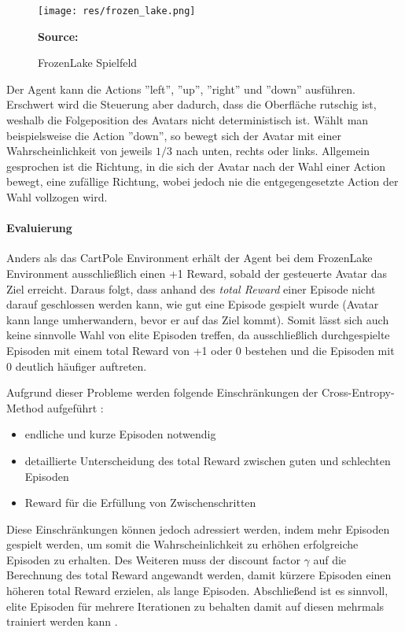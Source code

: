 \documentclass[11pt]{scrartcl}
\newcommand{\source}[1]{\vspace{-5pt} \caption*{\hfill \textbf{Source:} {#1}} }
\begin{document}
\begin{figure}[htp]
\centering
\texttt{[image: res/frozen\_lake.png]}
\caption{FrozenLake Spielfeld}
\source{\cite[~S.90 - Chapter 4 - Figure 5]{L2018}}
\label{fig:frozen_lake}
\end{figure}

\noindent
Der Agent kann die Actions ''left'', ''up'', ''right'' und ''down'' ausführen.
Erschwert wird die Steuerung aber dadurch, dass die Oberfläche rutschig ist, weshalb
die Folgeposition des Avatars nicht deterministisch ist. Wählt man beispielsweise die
Action ''down'', so bewegt sich der Avatar mit einer Wahrscheinlichkeit von jeweils
$1/3$ nach unten, rechts oder links. Allgemein gesprochen ist die Richtung, in die
sich der Avatar nach der Wahl einer Action bewegt, eine zufällige Richtung, wobei
jedoch nie die entgegengesetzte Action der Wahl vollzogen wird.


\paragraph*{Evaluierung}
\label{sec:cross_entropy_results}
\noindent
\newline
Anders als das CartPole Environment erhält der Agent bei dem FrozenLake Environment 
ausschließlich einen +1 Reward, sobald der gesteuerte Avatar das Ziel erreicht. Daraus folgt,
dass anhand des \textit{total Reward} einer Episode nicht darauf geschlossen werden kann,
wie gut eine Episode gespielt wurde (Avatar kann lange umherwandern, bevor er auf das Ziel kommt).
Somit lässt sich auch keine sinnvolle Wahl von elite Episoden treffen, da ausschließlich
durchgespielte Episoden mit einem total Reward von +1 oder 0 bestehen und die Episoden mit 0
deutlich häufiger auftreten.

Aufgrund dieser Probleme werden folgende Einschränkungen der Cross-Entropy-Method 
aufgeführt \cite[~S.92 f.]{L2018}:
\begin{itemize}
\itemsep0pt
\item endliche und kurze Episoden notwendig
\item detaillierte Unterscheidung des total Reward zwischen guten und schlechten Episoden
\item Reward für die Erfüllung von Zwischenschritten
  \label{itm:cross_entropy_limits}
\end{itemize}

Diese Einschränkungen können jedoch adressiert werden, indem mehr Episoden gespielt werden, 
um somit die Wahrscheinlichkeit zu erhöhen erfolgreiche Episoden zu erhalten. Des Weiteren
muss der discount factor $\gamma$ auf die Berechnung des total Reward angewandt werden, damit
kürzere Episoden einen höheren total Reward erzielen, als lange Episoden. Abschließend ist es
sinnvoll, elite Episoden für mehrere Iterationen zu behalten damit auf diesen mehrmals
trainiert werden kann \cite[~S.93]{L2018}.  
\end{document}
